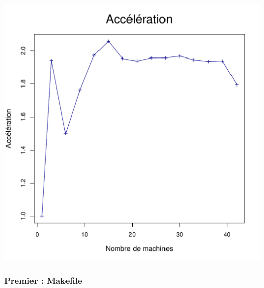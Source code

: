 \documentclass[a4paper, 11pt, titlepage]{article}
\begin{document}
\begin{center}
    \includegraphics[scale=0.45]{res/sujet_makefiles_blender_249_Makefile_nth8_acc.pdf}
\end{center}



\subsubsection {Premier : Makefile}
\end{document}
